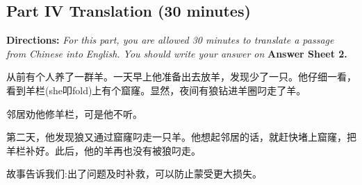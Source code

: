 \documentclass[UTF8,11pt]{ctexart}
\begin{document}
\subsection*{\textbf{Part IV} \textbf{Translation} \textbf{(30 minutes)}}


\textbf{Directions: }\textit{For this part, you are allowed 30 minutes to translate a passage from Chinese into} \textit{English. You should write your answer on}\textbf{ Answer Sheet 2.}


从前有个人养了一群羊。一天早上他准备出去放羊，发现少了一只。他仔细一看，看到羊栏(she叩fold)上有个窟窿。显然，夜间有狼钻进羊圈叼走了羊。


邻居劝他修羊栏，可是他不听。


第二天，他发现狼又通过窟窿叼走一只羊。他想起邻居的话，就赶快堵上窟窿，把羊栏补好。此后，他的羊再也没有被狼叼走。


故事告诉我们:出了问题及时补救，可以防止蒙受更大损失。
\end{document}
